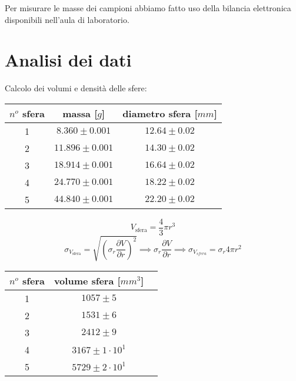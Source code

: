 \documentclass[8pt]{article}
\begin{document}
Per misurare le masse dei campioni abbiamo fatto uso della bilancia elettronica disponibili nell'aula
di laboratorio.

\section{Analisi dei dati}
Calcolo dei volumi e densità delle sfere:

\begin{center}
\begin{tabular}{ c c c }
\toprule
$n^o$ sfera & massa [$g$] & diametro sfera [$mm$] \\
\midrule
1 & $8.360 \pm 0.001$ & $12.64 \pm 0.02$ \\
2 & $11.896 \pm 0.001$ & $14.30 \pm 0.02$ \\
3 & $18.914 \pm 0.001$ & $16.64 \pm 0.02$ \\
4 & $24.770 \pm 0.001$ & $18.22 \pm 0.02$ \\
5 & $44.840 \pm 0.001$ & $22.20 \pm 0.02$ \\
\bottomrule
\end{tabular}
\end{center}

\bigskip

\begin{displaymath}
V_{\text{sfera}} = \frac{4}{3} \pi r^3
\end{displaymath}
\begin{displaymath}
\sigma_{V_{\text{sfera}}} = \sqrt{\left(\sigma_{r}\frac{\partial V}{\partial r}\right)^2} \implies \sigma_{r}\frac{\partial V}{\partial r} \implies \sigma_{V_{sfera}} = \sigma_{r} 4 \pi r^2
\end{displaymath}

\smallskip

\begin{center}
\begin{tabular}{ c c c }
\toprule
$n^o$ sfera & volume sfera [$mm^3$] \\
\midrule
1 & $1057 \pm 5$ \\
2 & $1531 \pm 6$ \\
3 & $2412 \pm 9$ \\
4 & $3167 \pm 1 \cdot 10^1$ \\
5 & $5729 \pm 2 \cdot 10^1$ \\
\bottomrule
\end{tabular}
\end{center} 

\bigskip
\end{document}
